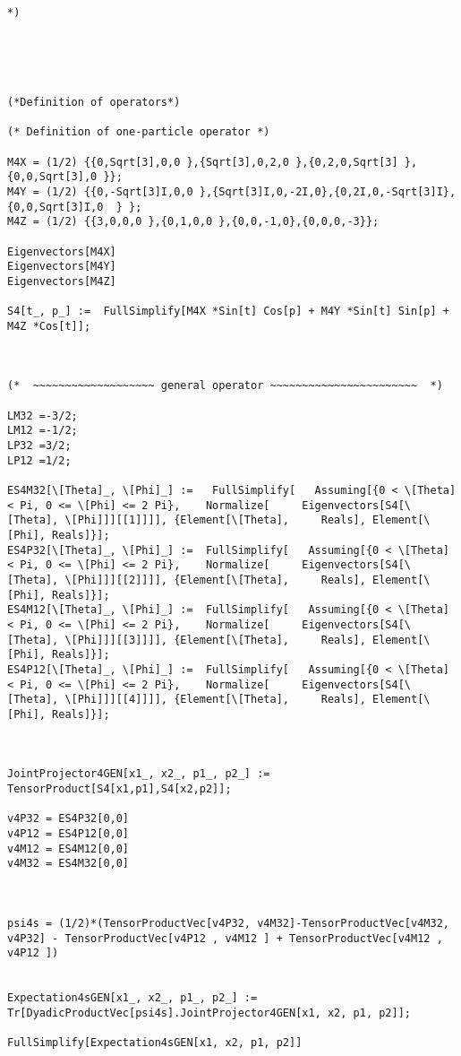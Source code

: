 \documentclass[%
 showpacs,
 showkeys,
 preprintnumbers,
 amsmath,amssymb,
 aps,
  pra,
  longbibliography,
 floatfix,
 ]{revtex4-1}
\begin{document}
{\begin{lstlisting}[backgroundcolor=\color{yellow!10},framerule=0pt,breaklines=true, frame=tb]
*)





(*Definition of operators*)

(* Definition of one-particle operator *)

M4X = (1/2) {{0,Sqrt[3],0,0 },{Sqrt[3],0,2,0 },{0,2,0,Sqrt[3] },{0,0,Sqrt[3],0 }};
M4Y = (1/2) {{0,-Sqrt[3]I,0,0 },{Sqrt[3]I,0,-2I,0},{0,2I,0,-Sqrt[3]I},{0,0,Sqrt[3]I,0  } };
M4Z = (1/2) {{3,0,0,0 },{0,1,0,0 },{0,0,-1,0},{0,0,0,-3}};

Eigenvectors[M4X]
Eigenvectors[M4Y]
Eigenvectors[M4Z]

S4[t_, p_] :=  FullSimplify[M4X *Sin[t] Cos[p] + M4Y *Sin[t] Sin[p] + M4Z *Cos[t]];



(*  ~~~~~~~~~~~~~~~~~~~ general operator ~~~~~~~~~~~~~~~~~~~~~~~  *)

LM32 =-3/2;
LM12 =-1/2;
LP32 =3/2;
LP12 =1/2;

ES4M32[\[Theta]_, \[Phi]_] :=   FullSimplify[   Assuming[{0 < \[Theta] < Pi, 0 <= \[Phi] <= 2 Pi},    Normalize[     Eigenvectors[S4[\[Theta], \[Phi]]][[1]]]], {Element[\[Theta],     Reals], Element[\[Phi], Reals]}];
ES4P32[\[Theta]_, \[Phi]_] :=  FullSimplify[   Assuming[{0 < \[Theta] < Pi, 0 <= \[Phi] <= 2 Pi},    Normalize[     Eigenvectors[S4[\[Theta], \[Phi]]][[2]]]], {Element[\[Theta],     Reals], Element[\[Phi], Reals]}];
ES4M12[\[Theta]_, \[Phi]_] :=  FullSimplify[   Assuming[{0 < \[Theta] < Pi, 0 <= \[Phi] <= 2 Pi},    Normalize[     Eigenvectors[S4[\[Theta], \[Phi]]][[3]]]], {Element[\[Theta],     Reals], Element[\[Phi], Reals]}];
ES4P12[\[Theta]_, \[Phi]_] :=  FullSimplify[   Assuming[{0 < \[Theta] < Pi, 0 <= \[Phi] <= 2 Pi},    Normalize[     Eigenvectors[S4[\[Theta], \[Phi]]][[4]]]], {Element[\[Theta],     Reals], Element[\[Phi], Reals]}];



JointProjector4GEN[x1_, x2_, p1_, p2_] :=  TensorProduct[S4[x1,p1],S4[x2,p2]];

v4P32 = ES4P32[0,0]
v4P12 = ES4P12[0,0]
v4M12 = ES4M12[0,0]
v4M32 = ES4M32[0,0]



psi4s = (1/2)*(TensorProductVec[v4P32, v4M32]-TensorProductVec[v4M32, v4P32] - TensorProductVec[v4P12 , v4M12 ] + TensorProductVec[v4M12 , v4P12 ])


Expectation4sGEN[x1_, x2_, p1_, p2_] := Tr[DyadicProductVec[psi4s].JointProjector4GEN[x1, x2, p1, p2]];

FullSimplify[Expectation4sGEN[x1, x2, p1, p2]]



\end{lstlisting}}
\end{document}
